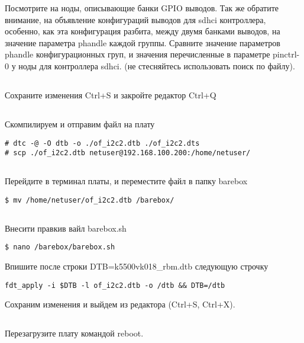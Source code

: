 Посмотрите на ноды, описывающие банки GPIO выводов. Так же обратите внимание, на объявление конфигураций выводов для sdhci контроллера, особенно, как эта конфигурация разбита, между двумя банками выводов, на значение параметра phandle каждой группы. Сравните значение параметров phandle конфигурационных груп, и значения перечисленные в параметре pinctrl-0 у ноды для контроллера  sdhci. (не стесняйтесь использовать поиск по файлу).

\subsection{}Сохраните изменения Ctrl+S и закройте редактор Ctrl+Q 

\subsection{}Скомпилируем и отправим файл на плату
\begin{lstlisting}[style=bash]
# dtc -@ -O dtb -o ./of_i2c2.dtb ./of_i2c2.dts
# scp ./of_i2c2.dtb netuser@192.168.100.200:/home/netuser/
\end{lstlisting}

\subsection{}Перейдите в терминал платы, и переместите файл в папку barebox
\begin{lstlisting}[style=bash]
$ mv /home/netuser/of_i2c2.dtb /barebox/
\end{lstlisting}

\subsection{}Внесити правкив вайл barebox.sh
\begin{lstlisting}[style=bash]
$ nano /barebox/barebox.sh
\end{lstlisting}
Впишите после строки DTB=k5500vk018\_rbm.dtb следующую строчку
\begin{lstlisting}[style=stdout]
fdt_apply -i $DTB -l of_i2c2.dtb -o /dtb && DTB=/dtb
\end{lstlisting}
Сохраним изменения и выйдем из редактора (Ctrl+S, Ctrl+X).

\subsection{}Перезагрузите плату командой reboot.

